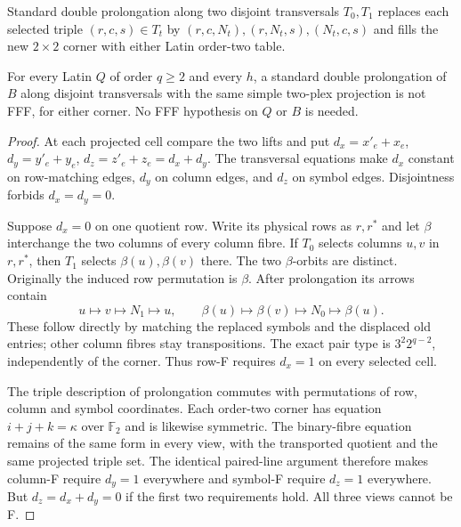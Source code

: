 Standard double prolongation along two disjoint transversals $T_0,T_1$
replaces each selected triple $(r,c,s)\in T_t$ by
$(r,c,N_t),(r,N_t,s),(N_t,c,s)$ and fills the new $2\times2$ corner
with either Latin order-two table.

\begin{theorem}
\label{thm:same-projection-obstruction}
For every Latin $Q$ of order $q\geq2$ and every $h$, a standard double
prolongation of $B$ along disjoint transversals with the same simple
two-plex projection is not FFF, for either corner.
No FFF hypothesis on $Q$ or $B$ is needed.
\end{theorem}
\begin{proof}
At each projected cell compare the two lifts and put
$d_x=x'_e+x_e$, $d_y=y'_e+y_e$, $d_z=z'_e+z_e=d_x+d_y$.
The transversal equations make $d_x$ constant on row-matching edges,
$d_y$ on column edges, and $d_z$ on symbol edges.
Disjointness forbids $d_x=d_y=0$.

Suppose $d_x=0$ on one quotient row. Write its physical rows as
$r,r^*$ and let $\beta$ interchange the two columns of every column
fibre. If $T_0$ selects columns $u,v$ in $r,r^*$, then $T_1$ selects
$\beta(u),\beta(v)$ there. The two $\beta$-orbits are distinct.
Originally the induced row permutation is $\beta$. After prolongation
its arrows contain
\[
 u\longmapsto v\longmapsto N_1\longmapsto u,\qquad
 \beta(u)\longmapsto\beta(v)\longmapsto N_0
       \longmapsto\beta(u).
\]
These follow directly by matching the replaced symbols and the displaced
old entries; other column fibres stay transpositions. The exact pair
type is $3^2 2^{q-2}$, independently of the corner. Thus row-F requires
$d_x=1$ on every selected cell.

The triple description of prolongation commutes with permutations
of row, column and symbol coordinates. Each order-two corner has
equation $i+j+k=\kappa$ over $\mathbb F_2$ and is likewise symmetric.
The binary-fibre equation remains of the same form in every view,
with the transported quotient and the same projected triple set.
The identical paired-line argument therefore makes column-F require
$d_y=1$ everywhere and symbol-F require $d_z=1$ everywhere.
But $d_z=d_x+d_y=0$ if the first two requirements hold. All three
views cannot be F.
\end{proof}

